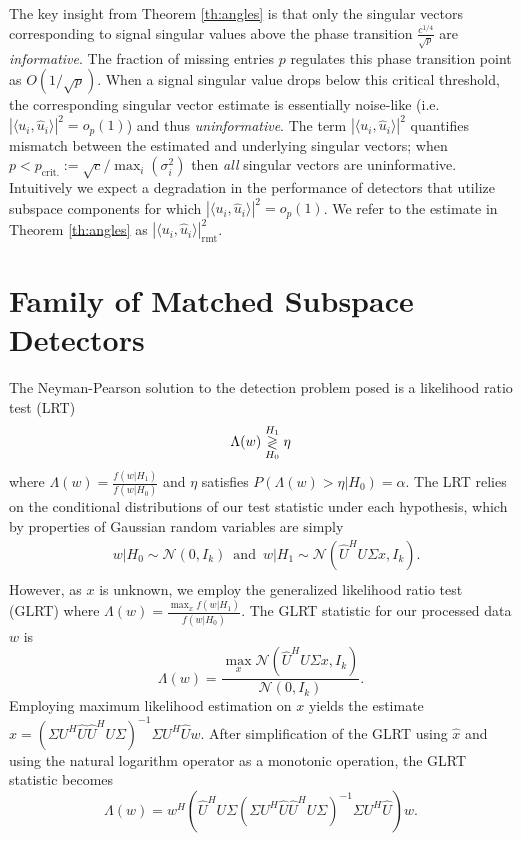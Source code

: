 The key insight from Theorem \ref{th:angles} is that only the singular vectors corresponding to signal singular values above the phase transition $\frac{c^{1/4}}{\sqrt{p}}$ are \textit{informative}. The fraction of missing entries $p$ regulates this phase transition point as $O(1/\sqrt{p})$. When a signal singular value drops below this critical threshold, the corresponding singular vector estimate is essentially noise-like  (i.e. $|\langle u_i,\widehat{u}_i\rangle|^2=o_{p}(1)$) and thus \textit{uninformative}. The term $|\langle u_i,\widehat{u}_i\rangle|^2$ quantifies mismatch between the estimated and underlying singular vectors;  when $p < p_{\text{crit.}} :=\sqrt{c}/\max_{i}(\sigma_{i}^{2})$ then \textit{all} singular vectors are uninformative. Intuitively we expect a degradation in the performance of detectors  that utilize subspace components for which $|\langle u_i,\widehat{u}_i\rangle|^2=o_{p}(1)$.  We refer to the estimate in Theorem \ref{th:angles} as $|\langle u_i,\widehat{u}_i\rangle|^2_{\text{rmt}}$.

\section{Family of Matched Subspace Detectors}\label{sec:derive}

The Neyman-Pearson solution to the detection problem posed is a likelihood ratio test (LRT)
\begin{equation*}
\Lambda(w) \overset{H_1}{\underset{H_0}{\gtrless}} \eta
\end{equation*}
where $\Lambda(w) = \frac{f(w|H_1)}{f(w|H_0)}$ and $\eta$ satisfies $P(\Lambda(w)>\eta|H_0)=\alpha$. The LRT relies on the conditional distributions of our test statistic under each hypothesis, which by properties of Gaussian random variables are simply
\begin{equation*}
\begin{aligned}
&w|H_0\sim\mathcal{N}(0,I_{k})\,\,\,\text{and}\,\,\, w|H_1\sim\mathcal{N}(\widehat{U}^HU\Sigma x, I_{k}).\\
\end{aligned}
\end{equation*}
However, as $x$ is unknown, we employ the generalized likelihood ratio test (GLRT) where $\Lambda(w) = \frac{\max_x f(w|H_1)}{f(w|H_0)}$. The GLRT statistic for our processed data $w$ is
\begin{equation*}
\Lambda(w)=\frac{\max_x\mathcal{N}(\widehat{U}^HU\Sigma x,I_{k})}{\mathcal{N}(0,I_{k})}.
\end{equation*}
Employing maximum likelihood estimation on $x$ yields the estimate $\widehat{x}=\left(\Sigma U^H\widehat{U}\widehat{U}^HU\Sigma\right)^{-1}\Sigma U^H\widehat{U}w$. After simplification of the GLRT using $\widehat{x}$ and using the natural logarithm operator as a monotonic operation, the GLRT statistic becomes
\begin{equation}\label{eq:oracle stat}
\Lambda(w) = w^H\left(\widehat{U}^HU\Sigma\left(\Sigma U^H\widehat{U}\widehat{U}^HU\Sigma\right)^{-1}\Sigma U^H\widehat{U}\right)w.
\end{equation}

